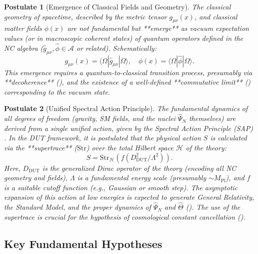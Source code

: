 \documentclass[11pt, a4paper]{article}
\newtheorem{postulate}{Postulate}
\theoremstyle{remark}
\newcommand{\Op}[1]{\hat{#1}}
\newcommand{\Str}{\mathrm{Str}}
\newcommand{\Mpl}{M_{\mathrm{Pl}}}
\begin{document}
\begin{postulate}[Emergence of Classical Fields and Geometry]
    \label{post:emergence_final}
    The classical geometry of spacetime, described by the metric tensor \( g_{\mu\nu}(x) \), and classical matter fields \( \phi(x) \) are not fundamental but **emerge** as vacuum expectation values (or in macroscopic coherent states) of quantum operators defined in the NC algebra (\( \hat{g}_{\mu\nu}, \hat{\phi} \in \mathcal{A} \) or related). Schematically:
    \[ g_{\mu\nu}(x) = \langle\Omega| \hat{g}_{\mu\nu} |\Omega\rangle, \quad \phi(x) = \langle\Omega| \hat{\phi} |\Omega\rangle. \]
    This emergence requires a quantum-to-classical transition process, presumably via **decoherence** (), and the existence of a well-defined **commutative limit** () corresponding to the vacuum state.
\end{postulate}

\begin{postulate}[Unified Spectral Action Principle]
    \label{post:action_final}
    The fundamental dynamics of all degrees of freedom (gravity, SM fields, and the nuclei \( \Op{\Psi}_N \) themselves) are derived from a single unified action, given by the Spectral Action Principle (SAP) \citep{ConnesChamseddine1997}. In the DUT framework, it is postulated that the physical action \( S \) is calculated via the **supertrace** (\( \Str \)) over the total Hilbert space \( \mathcal{H} \) of the theory:
    \begin{equation} \label{eq:accion_espectral_raw_final}
    S = \Str_{\mathcal{H}}(f(D_{\text{DUT}}^2/\Lambda^2)).
    \end{equation}
    Here, \( D_{\text{DUT}} \) is the generalized Dirac operator of the theory (encoding all NC geometry and fields), \( \Lambda \) is a fundamental energy scale (presumably \( \sim \Mpl \)), and \( f \) is a suitable cutoff function (e.g., Gaussian or smooth step). The asymptotic expansion of this action at low energies \citep{Vassilevich2003HeatKernel} is expected to generate General Relativity, the Standard Model, and the proper dynamics of \( \Op{\Psi}_N \) and \( \Op{\Theta} \) (). The use of the supertrace is crucial for the hypothesis of cosmological constant cancellation ().
\end{postulate}

\subsection{Key Fundamental Hypotheses }
\label{subsec:key_hypotheses_final}
\end{document}
